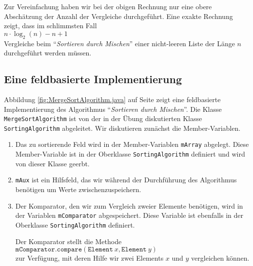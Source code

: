 Zur Vereinfachung haben wir bei der obigen Rechnung nur eine obere Absch\"atzung
der Anzahl der Vergleiche durchgef\"uhrt.  Eine exakte Rechnung zeigt, dass im
schlimmsten Fall \\[0.2cm]
\hspace*{1.3cm}  $n \cdot \log_2(n) - n + 1$ \\[0.2cm]
Vergleiche beim ``\emph{Sortieren durch Mischen}'' einer nicht-leeren Liste der L\"ange $n$
durchgef\"uhrt werden m\"ussen.

\subsection{Eine feldbasierte Implementierung}
Abbildung \ref{fig:MergeSortAlgorithm.java} auf Seite \pageref{fig:MergeSortAlgorithm.java}
zeigt eine feldbasierte  Implementierung des Algorithmus ``\emph{Sortieren durch
  Mischen}''.  Die Klasse \texttt{MergeSortAlgorithm} ist von der in der Übung
diskutierten Klasse \texttt{SortingAlgorithm} abgeleitet.
Wir diskutieren zun\"achst die Member-Variablen.
\begin{enumerate}
\item Das zu sortierende Feld wird in der Member-Variablen \texttt{mArray} 
      abgelegt.  Diese Member-Variable ist in der Oberklasse \texttt{SortingAlgorithm}
      definiert und wird von dieser Klasse geerbt.
\item \texttt{mAux} ist ein Hilfsfeld, das wir w\"ahrend der Durchf\"uhrung des Algorithmus
      ben\"otigen um Werte zwischenzuspeichern.
\item Der Komparator, den wir zum Vergleich zweier Elemente ben\"otigen,
      wird in der Variablen \texttt{mComparator} abgespeichert.  Diese Variable ist
      ebenfalls in der Oberklasse \texttt{SortingAlgorithm} definiert.
      
      Der Komparator stellt die Methode \\[0.2cm]
      \hspace*{1.3cm} 
      $\texttt{mComparator.compare}(\mathtt{Element}\ x, \mathtt{Element}\ y)$  \\[0.2cm]
      zur Verf\"ugung, mit deren Hilfe wir zwei Elements $x$ und $y$ vergleichen k\"onnen.
\end{enumerate}

